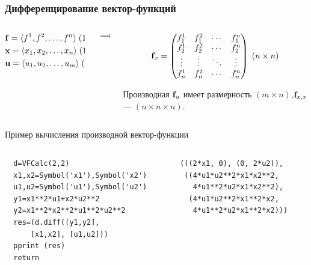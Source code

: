 \documentclass[10pt]{beamer}
\begin{document}
\begin{frame}
  \frametitle{Дифференцирование вектор-функций}
  \begin{columns}[c]
    \begin{column}{0.45\columnwidth}
      \begin{block}{}
        \begin{align*}
          &\mathbf{f}=\langle f^1,f^2,\ldots,f^n\rangle\; (1\times n),\\
          &\mathbf{x}=\langle x_1,x_2,\ldots,x_n\rangle\; (1\times n),\\
          &\mathbf{u}=\langle u_1,u_2,\ldots,u_m\rangle\; (1\times m).\\
        \end{align*}
      \end{block}
    \end{column}
    \begin{column}{0.05\columnwidth}
      $$\implies$$
    \end{column}
    \begin{column}{0.5\columnwidth}
      \begin{block}{}
\[\mathbf{f}_x =
 \begin{pmatrix}
  f^1_1 & f^2_1 & \cdots & f^n_1 \\
  f^1_2 & f^2_2 & \cdots & f^n_2 \\
  \vdots  & \vdots  & \ddots & \vdots  \\
  f^1_n & f^2_n & \cdots & f^n_n
 \end{pmatrix}\; (n\times n)\]

Производная $\mathbf{f}_u$ имеет размерность $(m\times n)$,\goodbreak $\mathbf{f}_{x,x}$ --- $(n\times n\times n).$
      \end{block}
    \end{column}
  \end{columns}
  \begin{block}{Пример вычисления производной вектор-функции}
    \begin{columns}[t]
      \begin{column}{0.55\columnwidth}
\vspace{-1em}
\begin{lstlisting}
  d=VFCalc(2,2)
  x1,x2=Symbol('x1'),Symbol('x2')
  u1,u2=Symbol('u1'),Symbol('u2')
  y1=x1**2*u1+x2*u2**2
  y2=x1**2*x2**2*u1**2*u2**2
  res=(d.diff([y1,y2],
      [x1,x2], [u1,u2]))
  pprint (res)
  return
\end{lstlisting}
      \end{column}
      \begin{column}{0.45\columnwidth}
\begin{lstlisting}
(((2*x1, 0), (0, 2*u2)),
 ((4*u1*u2**2*x1*x2**2,
   4*u1**2*u2*x1*x2**2),
  (4*u1*u2**2*x1**2*x2,
   4*u1**2*u2*x1**2*x2)))
\end{lstlisting}
      \end{column}
    \end{columns}
  \end{block}
\end{frame}
\end{document}
